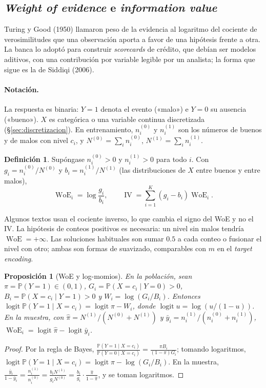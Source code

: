 \documentclass[11pt,a4paper]{article}
\theoremstyle{plain}
\newtheorem{proposicion}[teorema]{Proposición}
\theoremstyle{definition}
\newtheorem{definicion}[teorema]{Definición}
\theoremstyle{remark}
\newcommand{\Prob}{\mathbb{P}}
\newcommand{\logit}{\operatorname{logit}}
\newcommand{\WoE}{\operatorname{WoE}}
\newcommand{\IV}{\operatorname{IV}}
\newcommand{\1}{\mathbf{1}}
\begin{document}
\subsection{\emph{Weight of evidence} e \emph{information value}}\label{sec:woe}

Turing y Good (1950) llamaron peso de la evidencia al logaritmo del
cociente de verosimilitudes que una observación aporta a favor de una
hipótesis frente a otra. La banca lo adoptó para construir
\emph{scorecards} de crédito, que debían ser modelos aditivos, con una
contribución por variable legible por un analista; la forma que sigue es la
de Siddiqi (2006).

\paragraph{Notación.} La respuesta es binaria: $Y=1$ denota el evento
(«malo») e $Y=0$ su ausencia («bueno»). $X$ es categórica o una variable
continua discretizada (\S\ref{sec:discretizacion}). En entrenamiento,
$n_i^{(0)}$ y $n_i^{(1)}$ son los números de buenos y de malos con nivel
$c_i$, y $N^{(0)}=\sum_in_i^{(0)}$, $N^{(1)}=\sum_in_i^{(1)}$.

\begin{definicion}
Supóngase $n_i^{(0)}>0$ y $n_i^{(1)}>0$ para todo $i$. Con
$g_i=n_i^{(0)}/N^{(0)}$ y $b_i=n_i^{(1)}/N^{(1)}$ (las distribuciones de
$X$ entre buenos y entre malos),
\[
\WoE_i=\log\frac{g_i}{b_i},\qquad\IV=\sum_{i=1}^K(g_i-b_i)\WoE_i .
\]
\end{definicion}

Algunos textos usan el cociente inverso, lo que cambia el signo del WoE y
no el IV. La hipótesis de conteos positivos es necesaria: un nivel sin
malos tendría $\WoE=+\infty$. Las soluciones habituales son sumar $0.5$ a
cada conteo o fusionar el nivel con otro; ambas son formas de suavizado,
comparables con $m$ en el \emph{target encoding}.

\begin{proposicion}[WoE y log-momios]\label{prop:woe-bayes}
En la población, sean $\pi=\Prob(Y=1)\in(0,1)$, $G_i=\Prob(X=c_i\mid Y=0)>0$,
$B_i=\Prob(X=c_i\mid Y=1)>0$ y $W_i=\log(G_i/B_i)$. Entonces
$\logit\Prob(Y=1\mid X=c_i)=\logit\pi-W_i$, donde $\logit
u=\log(u/(1-u))$. En la muestra, con $\hat\pi=N^{(1)}/(N^{(0)}+N^{(1)})$ y
$\bar y_i=n_i^{(1)}/(n_i^{(0)}+n_i^{(1)})$,
$\WoE_i=\logit\hat\pi-\logit\bar y_i$.
\end{proposicion}

\begin{proof}
Por la regla de Bayes,
$\frac{\Prob(Y=1\mid X=c_i)}{\Prob(Y=0\mid X=c_i)}=\frac{\pi B_i}{(1-\pi)G_i}$;
tomando logaritmos, $\logit\Prob(Y=1\mid X=c_i)=\logit\pi-\log(G_i/B_i)$.
En la muestra,
$\frac{\bar y_i}{1-\bar y_i}=\frac{n_i^{(1)}}{n_i^{(0)}}=\frac{b_iN^{(1)}}{g_iN^{(0)}}
=\frac{b_i}{g_i}\cdot\frac{\hat\pi}{1-\hat\pi}$, y se toman logaritmos.
\end{proof}
\end{document}
